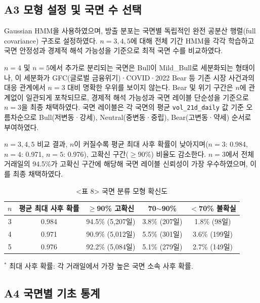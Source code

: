 \documentclass{article}
\begin{document}
\subsection*{A3 모형 설정 및 국면 수 선택}

Gaussian HMM을 사용하였으며, 방출 분포는 국면별 독립적인 완전 공분산 행렬(full covariance) 구조로 설정하였다. $n = 3, 4, 5$에 대해 전체 기간 HMM을 각각 학습하고 국면 안정성과 경제적 해석 가능성을 기준으로 최적 국면 수를 비교하였다.

$n = 4$ 및 $n = 5$에서 추가로 분리되는 국면은 Bull이 Mild\_Bull로 세분화되는 형태이나, 이 세분화가 GFC(글로벌 금융위기)·COVID·2022 Bear 등 기존 시장 사건과의 대응 관계에서 $n = 3$ 대비 명확한 우위를 보이지 않는다. Bear 및 위기 구간은 $n$에 관계없이 일관되게 포착되므로, 경제적 해석 가능성과 국면 레이블 단순성을 기준으로 $n = 3$을 최종 채택하였다. 국면 레이블은 각 국면의 평균 \texttt{vol\_21d\_daily} 값 기준 오름차순으로 Bull(저변동·강세), Neutral(중변동·중립), Bear(고변동·약세) 순서로 부여하였다.

$n = 3, 4, 5$ 비교 결과, $n$이 커질수록 평균 최대 사후 확률이 낮아지며($n=3$: 0.984, $n=4$: 0.971, $n=5$: 0.976), 고확신 구간($\geq 90\%$) 비율도 감소한다. $n = 3$에서 전체 거래일의 94.5\%가 고확신 구간에 해당해 국면 레이블 신뢰성이 가장 우수하였으며, 이를 최종 채택하였다.

\begin{table}[ht]
\centering
\caption{<표 8> 국면 분류 모형 확신도}
\label{tab:a1_confidence}
\begin{tabular}{ccccc}
\toprule
\textbf{$n$} & \textbf{평균 최대 사후 확률} & \textbf{$\geq$90\% 고확신} & \textbf{70$\sim$90\%} & \textbf{$<$70\% 불확실} \\
\midrule
3 & 0.984 & 94.5\% (5,207일) & 3.8\% (207일) & 1.8\% (98일) \\
4 & 0.971 & 90.9\% (5,012일) & 5.5\% (301일) & 3.6\% (199일) \\
5 & 0.976 & 92.2\% (5,084일) & 5.1\% (279일) & 2.7\% (149일) \\
\bottomrule
\end{tabular}
\begin{flushleft}
{\small $^*$ 최대 사후 확률: 각 거래일에서 가장 높은 국면 소속 사후 확률.}
\end{flushleft}
\end{table}

\subsection*{A4 국면별 기초 통계}
\end{document}
